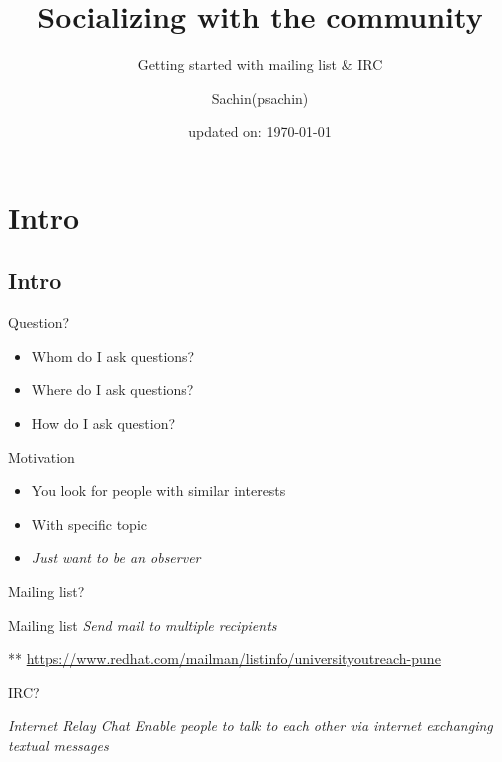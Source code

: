 \documentclass[10pt]{beamer}
\subtitle{Getting started with mailing list \& IRC}
\institute{University Connect Program, Red Hat}
\author{Sachin(psachin)}
\date{updated on: \today}
\title{Socializing with the community}
\begin{document}
\maketitle



\section{Intro}
\label{sec:orgb68c2bc}
\subsection{Intro}
\label{sec:orgf312de0}
\begin{frame}[label={sec:org9a3415c}]{Question?}
\begin{itemize}
\item Whom do I ask questions?
\item Where do I ask questions?
\item How do I ask question?
\end{itemize}
\end{frame}

\begin{frame}[label={sec:org4d85537}]{Motivation}
\begin{itemize}
\item You look for people with similar interests
\item With specific topic
\item \emph{Just want to be an observer}
\end{itemize}
\end{frame}

\begin{frame}[label={sec:org61ddfea}]{Mailing list?}
\begin{block}{Mailing list}
\emph{Send mail to multiple recipients}

\alert{**}
	 \url{https://www.redhat.com/mailman/listinfo/universityoutreach-pune}
\end{block}
\end{frame}

\begin{frame}[label={sec:orge5ac247}]{IRC?}
\begin{block}{\emph{Internet Relay Chat}}
   \emph{Enable people to talk to each other via \alert{internet} exchanging
textual messages}
\end{block}
\end{frame}
\end{document}
